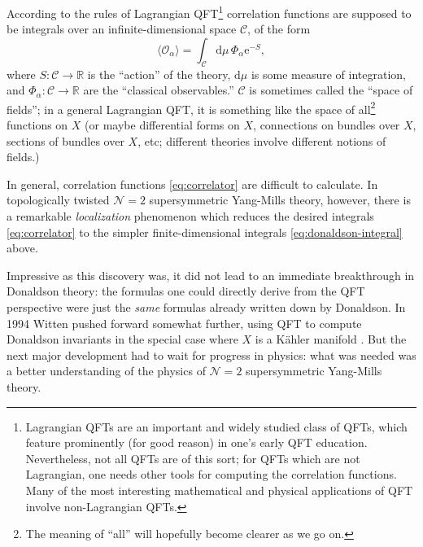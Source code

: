 \documentclass[12pt,letterpaper,reqno]{article}
\numberwithin{equation}{section}
\newcommand{\cC}{\ensuremath{\mathcal C}}
\newcommand{\cO}{\ensuremath{\mathcal O}}
\newcommand{\R}{\ensuremath{\mathbb R}}
\newcommand{\N}{{\mathcal N}}
\newcommand{\kahler}{K\"ahler\xspace}
\newcommand{\e}{{\mathrm e}}
\newcommand{\de}{\mathrm{d}}
\newcommand{\IP}[1]{\langle#1\rangle}
\newcommand{\ti}[1]{\textit{#1}}
\begin{document}
According to the rules of Lagrangian QFT\footnote{Lagrangian QFTs are an
important and widely studied class of QFTs, which feature prominently
(for good reason) in one's early QFT education. Nevertheless, not
all QFTs are of this sort; for QFTs which are not Lagrangian, one
needs other tools for computing the correlation functions. Many of the
most interesting mathematical and physical applications of QFT
involve non-Lagrangian QFTs.}
correlation functions are supposed to be integrals over an
infinite-dimensional space $\cC$, of the form
\begin{equation} \label{eq:correlator}
 \IP{\cO_\alpha} = \int_\cC \de \mu \, \Phi_\alpha \e^{-S},
\end{equation}
where $S: \cC \to \R$ is the ``action'' of the theory,
$\de \mu$ is some measure of integration,
and $\Phi_\alpha: \cC \to \R$ are the ``classical observables.''
$\cC$ is sometimes called the ``space of fields''; in a general Lagrangian QFT, it is
something like the space of all\footnote{The meaning of ``all'' will
hopefully become clearer as we go on.} functions on $X$ (or maybe differential forms on $X$,
connections on bundles over $X$, sections of bundles over $X$, etc; different theories involve
different notions of fields.) 

In general, correlation functions \eqref{eq:correlator}
are difficult to calculate.
In topologically twisted $\N=2$ supersymmetric Yang-Mills theory, 
however, there is a remarkable
\ti{localization} phenomenon which reduces the desired
integrals \eqref{eq:correlator} to the simpler
finite-dimensional integrals \eqref{eq:donaldson-integral} above.


Impressive as this discovery was, it did not lead to an immediate
breakthrough in Donaldson theory:
the formulas one could directly
derive from the QFT perspective were just the \ti{same} formulas
already written down by Donaldson. In 1994 Witten
pushed forward somewhat further, using QFT to compute Donaldson invariants
in the special case where $X$ is a 
\kahler manifold \cite{Witten:1994ev}. But the next major development 
had to wait for progress in physics: what was needed was a better understanding of the 
physics of $\N=2$ supersymmetric Yang-Mills theory.
\end{document}
